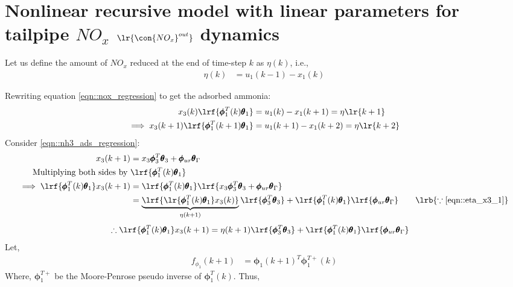 \newpage
\section{Nonlinear recursive model with linear parameters for tailpipe $NO_x$ $\lr{\con{NO_x}^{out}}$ dynamics}

Let us define the amount of $NO_x$ reduced at the end of time-step $k$ as $\eta(k)$, i.e.,
\begin{align}
        \eta (k) &= u_1(k-1) - x_1(k)
        \label{eqn::eta_proc}
\end{align}

Rewriting equation \ref{eqn::nox_regression} to get the adsorbed ammonia:
\begin{align}
        x_3(k) \lrf{\pmb \phi_1^T(k) \pmb \theta_1} &= u_1(k)-x_1(k+1)  = \eta\lr{k+1}
        \label{eqn::eta_x3_1}\\
        \implies x_3(k+1) \lrf{\pmb \phi_1^T(k+1) \pmb \theta_1} &= u_1(k+1)-x_1(k+2)  = \eta\lr{k+2}
        \label{eqn::eta_x3_2}
\end{align}
Consider \ref{eqn::nh3_ads_regression}:
\begin{align*}
     x_3(k+1) &= x_3 \pmb \phi_3^T \pmb \theta_3 + \pmb \phi_{ur} \pmb \theta_\Gamma\\
     \text{Multiplying both sides by } & \lrf{\pmb \phi_1^T(k) \pmb \theta_1} \\
     \implies \lrf{\pmb \phi_1^T(k) \pmb \theta_1} x_3(k+1) &= \lrf{\pmb \phi_1^T(k) \pmb \theta_1} \lrf{x_3 \pmb \phi_3^T \pmb \theta_3 + \pmb \phi_{ur} \pmb \theta_\Gamma}\\
     &= \underbrace{\lrf{\lr{\pmb \phi_1^T(k) \pmb \theta_1}x_3(k)}}_{\eta(k+1)}
      \lrf{\pmb \phi_3^T \pmb \theta_3}
     + \lrf{\pmb \phi_1^T(k) \pmb \theta_1} \lrf{\pmb \phi_{ur} \pmb \theta_\Gamma}
     \qquad \lrb{\because \ref{eqn::eta_x3_1}}
\end{align*}
\begin{align}
        \therefore
        \lrf{\pmb \phi_1^T(k) \pmb \theta_1} x_3(k+1)
        &= \eta(k+1) \lrf{\pmb \phi_3^T \pmb \theta_3} + \lrf{\pmb \phi_1^T(k) \pmb \theta_1} \lrf{\pmb \phi_{ur} \pmb \theta_\Gamma}
        \label{eqn::r_nox_1}
\end{align}
Let,
\begin{align}
        f_{\phi_1}(k+1) &= \pmb \phi_1(k+1)^T \pmb \phi_1^{T+}(k)
        \label{eqn::f_phi_1}
\end{align}
Where, $\pmb \phi_1^{T+}$ be the Moore-Penrose pseudo inverse of $\pmb \phi_1^T(k)$. Thus,
